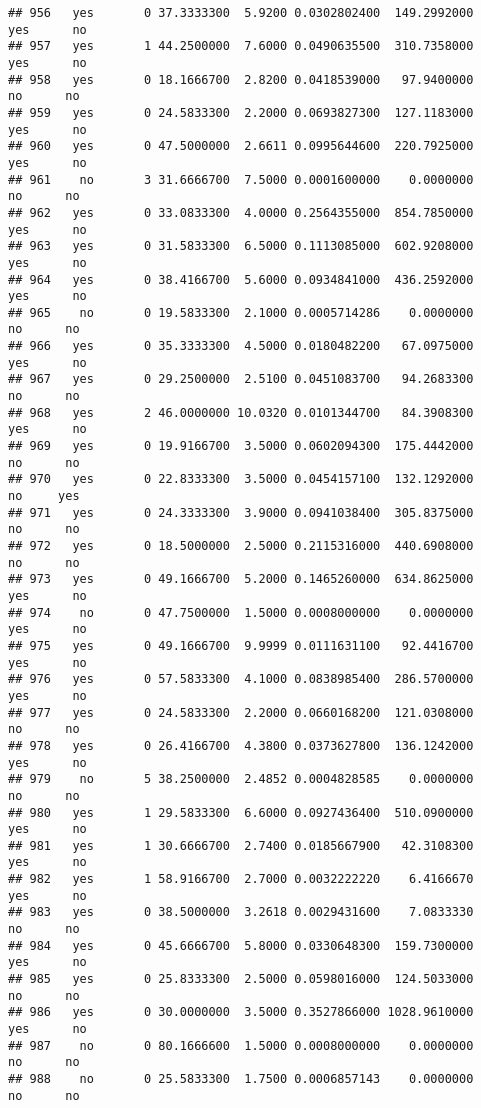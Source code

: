 \documentclass[]{article}
\begin{document}
\begin{verbatim}
## 956   yes       0 37.3333300  5.9200 0.0302802400  149.2992000   yes      no
## 957   yes       1 44.2500000  7.6000 0.0490635500  310.7358000   yes      no
## 958   yes       0 18.1666700  2.8200 0.0418539000   97.9400000    no      no
## 959   yes       0 24.5833300  2.2000 0.0693827300  127.1183000   yes      no
## 960   yes       0 47.5000000  2.6611 0.0995644600  220.7925000   yes      no
## 961    no       3 31.6666700  7.5000 0.0001600000    0.0000000    no      no
## 962   yes       0 33.0833300  4.0000 0.2564355000  854.7850000   yes      no
## 963   yes       0 31.5833300  6.5000 0.1113085000  602.9208000   yes      no
## 964   yes       0 38.4166700  5.6000 0.0934841000  436.2592000   yes      no
## 965    no       0 19.5833300  2.1000 0.0005714286    0.0000000    no      no
## 966   yes       0 35.3333300  4.5000 0.0180482200   67.0975000   yes      no
## 967   yes       0 29.2500000  2.5100 0.0451083700   94.2683300    no      no
## 968   yes       2 46.0000000 10.0320 0.0101344700   84.3908300   yes      no
## 969   yes       0 19.9166700  3.5000 0.0602094300  175.4442000    no      no
## 970   yes       0 22.8333300  3.5000 0.0454157100  132.1292000    no     yes
## 971   yes       0 24.3333300  3.9000 0.0941038400  305.8375000    no      no
## 972   yes       0 18.5000000  2.5000 0.2115316000  440.6908000    no      no
## 973   yes       0 49.1666700  5.2000 0.1465260000  634.8625000   yes      no
## 974    no       0 47.7500000  1.5000 0.0008000000    0.0000000   yes      no
## 975   yes       0 49.1666700  9.9999 0.0111631100   92.4416700   yes      no
## 976   yes       0 57.5833300  4.1000 0.0838985400  286.5700000   yes      no
## 977   yes       0 24.5833300  2.2000 0.0660168200  121.0308000    no      no
## 978   yes       0 26.4166700  4.3800 0.0373627800  136.1242000   yes      no
## 979    no       5 38.2500000  2.4852 0.0004828585    0.0000000    no      no
## 980   yes       1 29.5833300  6.6000 0.0927436400  510.0900000   yes      no
## 981   yes       1 30.6666700  2.7400 0.0185667900   42.3108300   yes      no
## 982   yes       1 58.9166700  2.7000 0.0032222220    6.4166670   yes      no
## 983   yes       0 38.5000000  3.2618 0.0029431600    7.0833330    no      no
## 984   yes       0 45.6666700  5.8000 0.0330648300  159.7300000   yes      no
## 985   yes       0 25.8333300  2.5000 0.0598016000  124.5033000    no      no
## 986   yes       0 30.0000000  3.5000 0.3527866000 1028.9610000   yes      no
## 987    no       0 80.1666600  1.5000 0.0008000000    0.0000000    no      no
## 988    no       0 25.5833300  1.7500 0.0006857143    0.0000000    no      no

\end{verbatim}
\end{document}
